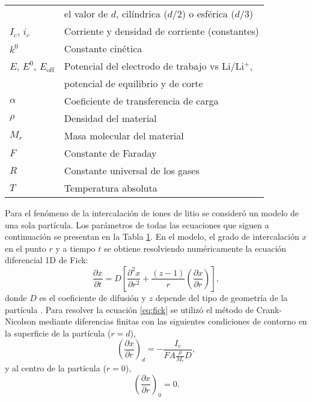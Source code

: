 \begin{table}[h!]
{\begin{tabular}{l l}
                & el valor de $d$, cilíndrica ($d/2$) o esférica ($d/3$) \\
        $I_c$, $i_c$ & Corriente y densidad de corriente (constantes) \\
        $k^0$ & Constante cinética \\
        $E$, $E^0$, $E_{\text{off}}$ & Potencial del electrodo de trabajo vs Li/Li$^+$,\\
                                     & potencial de equilibrio y de corte \\
        $\alpha$ & Coeficiente de transferencia de carga \\
        $\rho$ & Densidad del material \\
        $M_r$ & Masa molecular del material \\
        $F$ & Constante de Faraday \\
        $R$ & Constante universal de los gases \\
        $T$ & Temperatura absoluta \\
        \bottomrule
    \end{tabular}
    }{}
    \label{t:params}
\end{table}

Para el fenómeno de la intercalación de iones de litio se consideró un modelo de 
una sola partícula. Los parámetros de todas las ecuaciones que siguen a continuación se
presentan en la Tabla \ref{t:params}. En el modelo, el grado de intercalación $x$
en el punto $r$ y a tiempo $t$ se obtiene resolviendo numéricamente la ecuación diferencial 1D
de Fick:
\begin{equation}\label{eq:fick}
    \frac{\partial x}{\partial t} = D \left[ \frac{\partial^2 x}{\partial r^2} + \frac{(z - 1)}{r} \left(\frac{\partial x}{\partial r}\right) \right],
\end{equation}
donde $D$ es el coeficiente de difusión y $z$ depende del tipo de geometría de la 
partícula \cite{vassiliev2016}. Para resolver la ecuación \ref{eq:fick} se 
utilizó el método de Crank-Nicolson mediante diferencias finitas 
\cite{crank-nicolson} con las siguientes condiciones de contorno en la superficie
de la partícula ($r = d$),
\begin{equation}
    \left(\frac{\partial x}{\partial r}\right)_d = - \frac{I_c}{F A \frac{\rho}{M_r}D},
\end{equation}
y al centro de la partícula ($r = 0$),
\begin{equation}
    \left(\frac{\partial x}{\partial r}\right)_0 = 0.
\end{equation}

